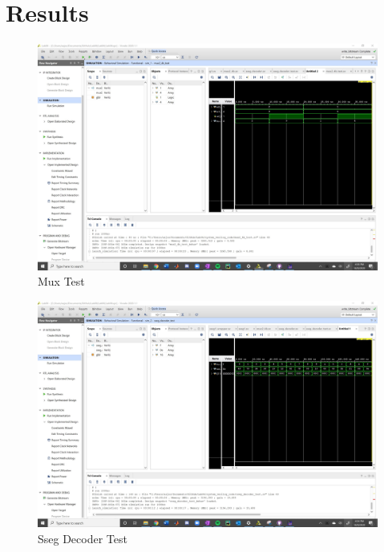 \documentclass[11pt]{article}
\newcommand{\Verilog}[2][]{%
	
}
\begin{document}
\Verilog[firstline=23, caption=Mux ,label=code:file_1]{mux2_4b.sv}
\Verilog[firstline=23, caption=Mux Test ,label=code:file_2]{mux2_4b_test.sv}
\Verilog[firstline=23, caption=Sseg Decoder ,label=code:file_3]{sseg_decoder.sv}
\Verilog[firstline=23, caption=Sseg Decoder Test ,label=code:file_4]{sseg_decoder_test.sv}
\Verilog[firstline=23, caption=Sseg1 ,label=code:file_5]{sseg1.sv}
\Verilog[firstline=23, caption=Sseg1 Test ,label=code:file_6]{sseg1_test.sv}

\section*{Results}

\begin{figure}[ht] 
	\includegraphics[width=1\textwidth,trim=19cm 14cm 0cm 6cm,clip]{mux2_4b_test_screen}
	\caption{Mux Test}
	\label{fig:mux2_4b_scrn}
\end{figure}


\begin{figure}[ht]
	\includegraphics[width=1\textwidth,trim=19cm 14cm 0cm 6cm,clip]{sseg_decoder_test_screen}
	\caption{Sseg Decoder Test}
	\label{fig:sseg_decoder_scrn}
\end{figure}
\end{document}
